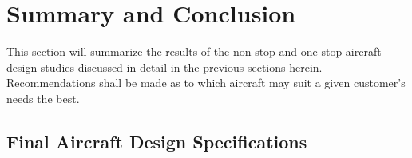 \documentclass{article}
\begin{document}
    \pagebreak
    \section{Summary and Conclusion}
    \label{sec:conclusion}
        \begin{flushleft}
            This section will summarize the results of the non-stop and one-stop
            aircraft design studies discussed in detail in the previous sections
            herein. Recommendations shall be made as to which aircraft may suit a
            given customer's needs the best.
        \end{flushleft}
    \subsection{Final Aircraft Design Specifications}
    \label{sec:optimized}
\end{document}
